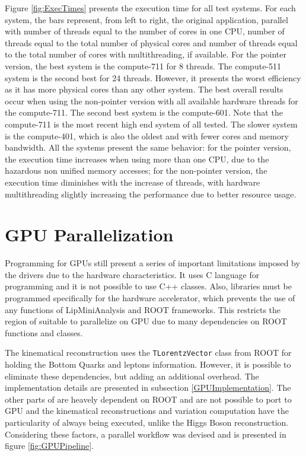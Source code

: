 Figure \ref{fig:ExecTimes} presents the execution time for all test systems. For each system, the bars represent, from left to right, the original application, parallel with number of threads equal to the number of cores in one CPU, number of threads equal to the total number of physical cores and number of threads equal to the total number of cores with multithreading, if available. For the pointer version, the best system is the compute-711 for 8 threads. The compute-511 system is the second best for 24 threads. However, it presents the worst efficiency as it has more physical cores than any other system. The best overall results occur when using the non-pointer version with all available hardware threads for the compute-711. The second best system is the compute-601. Note that the compute-711 is the most recent high end system of all tested. The slower system is the compute-401, which is also the oldest and with fewer cores and memory bandwidth. All the systems present the same behavior: for the pointer version, the execution time increases when using more than one CPU, due to the hazardous non unified memory accesses; for the non-pointer version, the execution time diminishes with the increase of threads, with hardware multithreading slightly increasing the performance due to better resource usage.

\section{GPU Parallelization}
\label{Parallelization:GPU}

Programming for GPUs still present a series of important limitations imposed by the drivers due to the hardware characteristics. It uses C language for programming and it is not possible to use C++ classes. Also, libraries must be programmed specifically for the hardware accelerator, which prevents the use of any functions of LipMiniAnalysis and ROOT frameworks. This restricts the region of \ttDilepKinFit suitable to parallelize on GPU due to many dependencies on ROOT functions and classes.

The kinematical reconstruction uses the \texttt{TLorentzVector} class from ROOT for holding the Bottom Quarks and leptons information. However, it is possible to eliminate these dependencies, but adding an additional overhead. The implementation details are presented in subsection \ref{GPUImplementation}. The other parts of \ttDilepKinFit are heavely dependent on ROOT and are not possible to port to GPU and the kinematical reconstructions and variation computation have the particularity of always being executed, unlike the Higgs Boson reconstruction. Considering these factors, a parallel workflow was devised and is presented in figure \ref{fig:GPUPipeline}.

